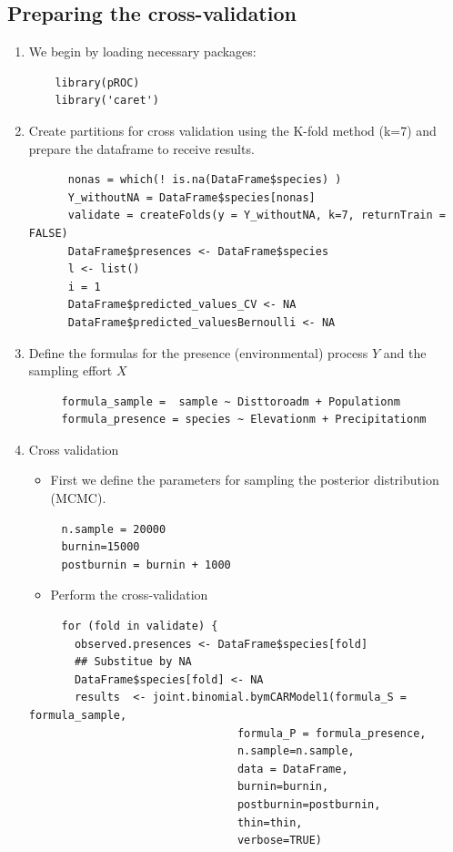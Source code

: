 \documentclass[11pt]{article}
\begin{document}
\subsection{Preparing the cross-validation}
\label{sec:orgb25c04d}
\begin{enumerate}
\item We begin by loading necessary packages:
\begin{verbatim}
    library(pROC)
    library('caret')
\end{verbatim}

\item Create partitions for cross validation using the K-fold method (k=7) and prepare the dataframe to receive results.
\begin{verbatim}
      nonas = which(! is.na(DataFrame$species) )
      Y_withoutNA = DataFrame$species[nonas]
      validate = createFolds(y = Y_withoutNA, k=7, returnTrain = FALSE)
      DataFrame$presences <- DataFrame$species
      l <- list()
      i = 1
      DataFrame$predicted_values_CV <- NA
      DataFrame$predicted_valuesBernoulli <- NA
\end{verbatim}

\item Define the formulas for the presence (environmental) process \(Y\) and the sampling effort \(X\)
\begin{verbatim}
     formula_sample =  sample ~ Disttoroadm + Populationm
     formula_presence = species ~ Elevationm + Precipitationm
\end{verbatim}

\item Cross validation
\begin{itemize}
\item First we define the parameters for sampling the posterior distribution (MCMC).
\end{itemize}
\begin{verbatim}
     n.sample = 20000
     burnin=15000
     postburnin = burnin + 1000
\end{verbatim}
\begin{itemize}
\item Perform the cross-validation
\end{itemize}
\begin{verbatim}
     for (fold in validate) {
       observed.presences <- DataFrame$species[fold]
       ## Substitue by NA
       DataFrame$species[fold] <- NA
       results  <- joint.binomial.bymCARModel1(formula_S = formula_sample,
                                formula_P = formula_presence,
                                n.sample=n.sample,
                                data = DataFrame,
                                burnin=burnin,
                                postburnin=postburnin,
                                thin=thin,
                                verbose=TRUE)


\end{verbatim}
\end{enumerate}
\end{document}
